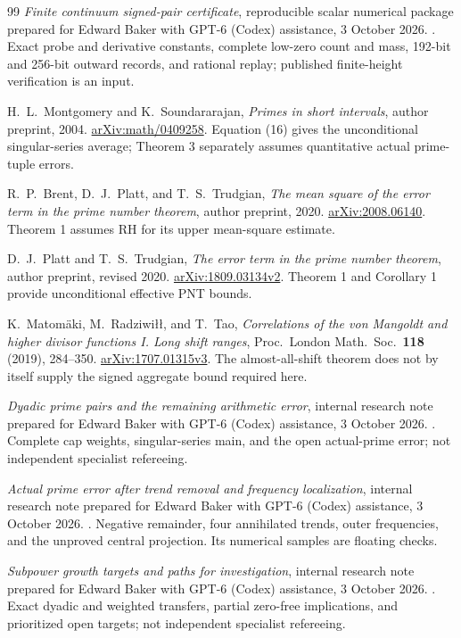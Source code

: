 \documentclass[11pt]{article}
\numberwithin{equation}{section}
\theoremstyle{definition}
\theoremstyle{remark}
\begin{document}
\begin{thebibliography}{99}
\emph{Finite continuum signed-pair certificate},
reproducible scalar numerical package prepared for Edward Baker with
GPT-6 (Codex) assistance, 3 October 2026.
.
Exact probe and derivative constants, complete low-zero count and mass,
192-bit and 256-bit outward records, and rational replay; published
finite-height verification is an input.


H.~L.~Montgomery and K.~Soundararajan,
\emph{Primes in short intervals}, author preprint, 2004.
\href{https://arxiv.org/abs/math/0409258}{arXiv:math/0409258}.
Equation (16) gives the unconditional singular-series average;
Theorem 3 separately assumes quantitative actual prime-tuple errors.

R.~P.~Brent, D.~J.~Platt, and T.~S.~Trudgian,
\emph{The mean square of the error term in the prime number theorem},
author preprint, 2020.
\href{https://arxiv.org/abs/2008.06140}{arXiv:2008.06140}.
Theorem 1 assumes RH for its upper mean-square estimate.

D.~J.~Platt and T.~S.~Trudgian,
\emph{The error term in the prime number theorem},
author preprint, revised 2020.
\href{https://arxiv.org/abs/1809.03134v2}{arXiv:1809.03134v2}.
Theorem 1 and Corollary 1 provide unconditional effective PNT bounds.

K.~Matom\"aki, M.~Radziwi\l\l, and T.~Tao,
\emph{Correlations of the von Mangoldt and higher divisor functions I.
Long shift ranges},
Proc.\ London Math.\ Soc.\ \textbf{118} (2019), 284--350.
\href{https://arxiv.org/abs/1707.01315v3}{arXiv:1707.01315v3}.
The almost-all-shift theorem does not by itself supply the signed
aggregate bound required here.

\emph{Dyadic prime pairs and the remaining arithmetic error},
internal research note prepared for Edward Baker with GPT-6 (Codex)
assistance, 3 October 2026.
.
Complete cap weights, singular-series main, and the open actual-prime
error; not independent specialist refereeing.

\emph{Actual prime error after trend removal and frequency localization},
internal research note prepared for Edward Baker with GPT-6 (Codex)
assistance, 3 October 2026.
.
Negative remainder, four annihilated trends, outer frequencies, and the
unproved central projection. Its numerical samples are floating checks.

\emph{Subpower growth targets and paths for investigation},
internal research note prepared for Edward Baker with GPT-6 (Codex)
assistance, 3 October 2026.
.
Exact dyadic and weighted transfers, partial zero-free implications,
and prioritized open targets; not independent specialist refereeing.

\end{thebibliography}
\end{document}
